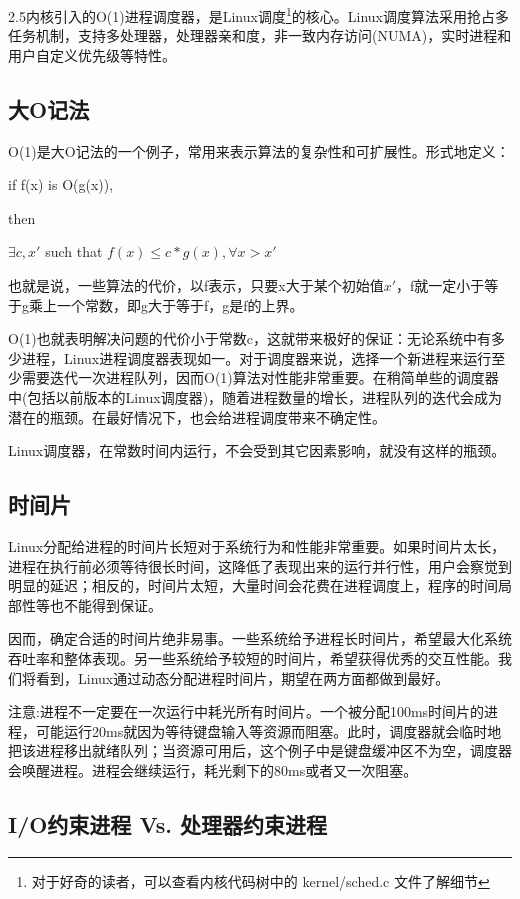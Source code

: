 2.5内核引入的O(1)进程调度器，是Linux调度\footnote[1]{对于好奇的读者，可以查看内核代码树中的 kernel/sched.c 文件了解细节}的核心。Linux调度算法采用抢占多任务机制，支持多处理器，处理器亲和度，非一致内存访问(NUMA)，实时进程和用户自定义优先级等特性。

\subsection{大O记法}
O(1)是大O记法的一个例子，常用来表示算法的复杂性和可扩展性。形式地定义：
\begin{center}
  if f(x) is O(g(x)),

  then

  $\exists c,x'$ such that $f(x) \le c * g(x), \forall x > x'$
\end{center}

也就是说，一些算法的代价，以f表示，只要x大于某个初始值$x'$，f就一定小于等于g乘上一个常数，即g大于等于f，g是f的上界。

O(1)也就表明解决问题的代价小于常数c，这就带来极好的保证：无论系统中有多少进程，Linux进程调度器表现如一。对于调度器来说，选择一个新进程来运行至少需要迭代一次进程队列，因而O(1)算法对性能非常重要。在稍简单些的调度器中(包括以前版本的Linux调度器)，随着进程数量的增长，进程队列的迭代会成为潜在的瓶颈。在最好情况下，也会给进程调度带来不确定性。

Linux调度器，在常数时间内运行，不会受到其它因素影响，就没有这样的瓶颈。

\subsection{时间片}

Linux分配给进程的时间片长短对于系统行为和性能非常重要。如果时间片太长，进程在执行前必须等待很长时间，这降低了表现出来的运行并行性，用户会察觉到明显的延迟；相反的，时间片太短，大量时间会花费在进程调度上，程序的时间局部性等也不能得到保证。

因而，确定合适的时间片绝非易事。一些系统给予进程长时间片，希望最大化系统吞吐率和整体表现。另一些系统给予较短的时间片，希望获得优秀的交互性能。我们将看到，Linux通过动态分配进程时间片，期望在两方面都做到最好。

注意:进程不一定要在一次运行中耗光所有时间片。一个被分配100ms时间片的进程，可能运行20ms就因为等待键盘输入等资源而阻塞。此时，调度器就会临时地把该进程移出就绪队列；当资源可用后，这个例子中是键盘缓冲区不为空，调度器会唤醒进程。进程会继续运行，耗光剩下的80ms或者又一次阻塞。

\subsection{I/O约束进程 Vs. 处理器约束进程}

